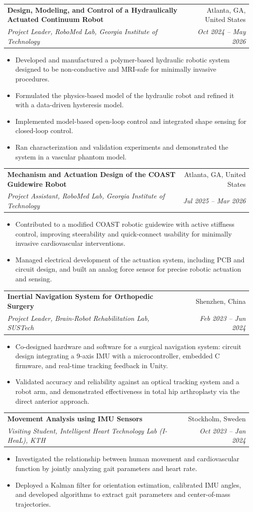 \documentclass[letterpaper,10pt]{article}
\makeatletter
\newcommand{\resumeItem}[1]{
  \item\small{{#1 \vspace{-2pt}}}
}
\newcommand{\resumeSubheading}[4]{
  \vspace{-2pt}\item
  \begin{tabular*}{0.97\textwidth}[t]{l@{\extracolsep{\fill}}r}
    \textbf{#1} & #2 \\
    \textit{\small#3} & \textit{\small #4} \\
  \end{tabular*}\vspace{-7pt}
}
\newcommand{\resumeItemListStart}{\begin{itemize}}
\newcommand{\resumeItemListEnd}{\end{itemize}\vspace{-5pt}}
\makeatother
\begin{document}
\resumeSubheading
{Design, Modeling, and Control of a Hydraulically Actuated Continuum Robot}{Atlanta, GA, United States}
{Project Leader, RoboMed Lab, Georgia Institute of Technology}{Oct 2024 -- May 2026}
\resumeItemListStart
\resumeItem{Developed and manufactured a polymer-based hydraulic robotic system designed to be
  non-conductive and MRI-safe for minimally invasive procedures.}
\resumeItem{Formulated the physics-based model of the hydraulic robot and refined it with a data-driven
  hysteresis model.}
\resumeItem{Implemented model-based open-loop control and integrated shape sensing for closed-loop control.}
\resumeItem{Ran characterization and validation experiments and demonstrated the system in a vascular
  phantom model.}
\resumeItemListEnd

\resumeSubheading
{Mechanism and Actuation Design of the COAST Guidewire Robot}{Atlanta, GA, United States}
{Project Assistant, RoboMed Lab, Georgia Institute of Technology}{Jul 2025 -- Mar 2026}
\resumeItemListStart
\resumeItem{Contributed to a modified COAST robotic guidewire with active stiffness control, improving
  steerability and quick-connect usability for minimally invasive cardiovascular interventions.}
\resumeItem{Managed electrical development of the actuation system, including PCB and circuit design, and
  built an analog force sensor for precise robotic actuation and sensing.}
\resumeItemListEnd

\resumeSubheading
{Inertial Navigation System for Orthopedic Surgery}{Shenzhen, China}
{Project Leader, Brain-Robot Rehabilitation Lab, SUSTech}{Feb 2023 -- Jun 2024}
\resumeItemListStart
\resumeItem{Co-designed hardware and software for a surgical navigation system: circuit design integrating a
  9-axis IMU with a microcontroller, embedded C firmware, and real-time tracking feedback in Unity.}
\resumeItem{Validated accuracy and reliability against an optical tracking system and a robot arm, and
  demonstrated effectiveness in total hip arthroplasty via the direct anterior approach.}
\resumeItemListEnd

\resumeSubheading
{Movement Analysis using IMU Sensors}{Stockholm, Sweden}
{Visiting Student, Intelligent Heart Technology Lab (I-HeaL), KTH}{Oct 2023 -- Jan 2024}
\resumeItemListStart
\resumeItem{Investigated the relationship between human movement and cardiovascular function by jointly
  analyzing gait parameters and heart rate.}
\resumeItem{Deployed a Kalman filter for orientation estimation, calibrated IMU angles, and developed
  algorithms to extract gait parameters and center-of-mass trajectories.}
\resumeItemListEnd
\end{document}
